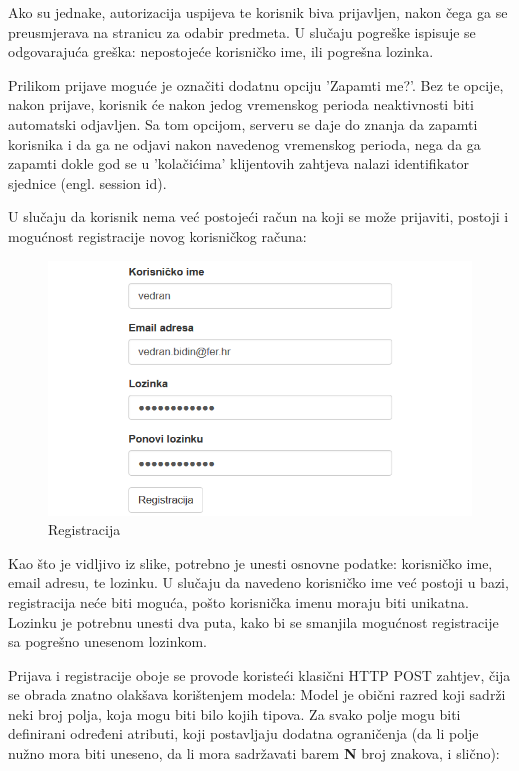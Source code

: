 \documentclass[times, utf8, zavrsni]{fer}
\begin{document}
\lstset{style=csharp}


Ako su jednake, autorizacija uspijeva te korisnik biva prijavljen, nakon čega ga se preusmjerava na stranicu za odabir predmeta. U slučaju pogreške ispisuje se odgovarajuća greška: nepostojeće korisničko ime, ili pogrešna lozinka.

Prilikom prijave moguće je označiti dodatnu opciju 'Zapamti me?'. Bez te opcije, nakon prijave, korisnik će nakon jedog vremenskog perioda neaktivnosti biti automatski odjavljen. Sa tom opcijom, serveru se daje do znanja da zapamti korisnika i da ga ne odjavi nakon navedenog vremenskog perioda, nega da ga zapamti dokle god se u 'kolačićima' klijentovih zahtjeva nalazi identifikator sjednice (engl. session id).

U slučaju da korisnik nema već postojeći račun na koji se može prijaviti, postoji i mogućnost registracije novog korisničkog računa:

\begin{figure}[H]
\centering
\includegraphics[width=\textwidth,height=\textheight,keepaspectratio]{img/registracija.png}
\caption{Registracija}
\label{fig:registracija}
\end{figure}

Kao što je vidljivo iz slike, potrebno je unesti osnovne podatke: korisničko ime, email adresu, te lozinku. U slučaju da navedeno korisničko ime već postoji u bazi, registracija neće biti moguća, pošto korisnička imenu moraju biti unikatna. Lozinku je potrebnu unesti dva puta, kako bi se smanjila mogućnost registracije sa pogrešno unesenom lozinkom.

Prijava i registracije oboje se provode koristeći klasični HTTP POST zahtjev, čija se obrada znatno olakšava korištenjem modela:
Model je obični razred koji sadrži neki broj polja, koja mogu biti bilo kojih tipova. Za svako polje mogu biti definirani određeni atributi, koji postavljaju dodatna ograničenja (da li polje nužno mora biti uneseno, da li mora sadržavati barem \textbf{N} broj znakova, i slično):
\end{document}
